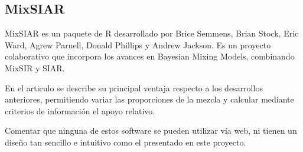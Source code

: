 \subsection{MixSIAR} 
MixSIAR es un paquete de R desarrollado por Brice Semmens, Brian Stock, Eric Ward, Agrew Parnell, Donald Phillips y Andrew Jackson. Es un proyecto colaborativo que incorpora los avances en Bayesian Mixing Models, combinando MixSIR y SIAR.

En el articulo \cite{analyzingMix2018} se describe su principal ventaja respecto a los desarrollos anteriores, permitiendo variar las proporciones de la mezcla y calcular mediante criterios de información el apoyo relativo.

Comentar que ninguna de estos software se pueden utilizar vía web, ni tienen un diseño tan sencillo e intuitivo como el presentado en este proyecto.
